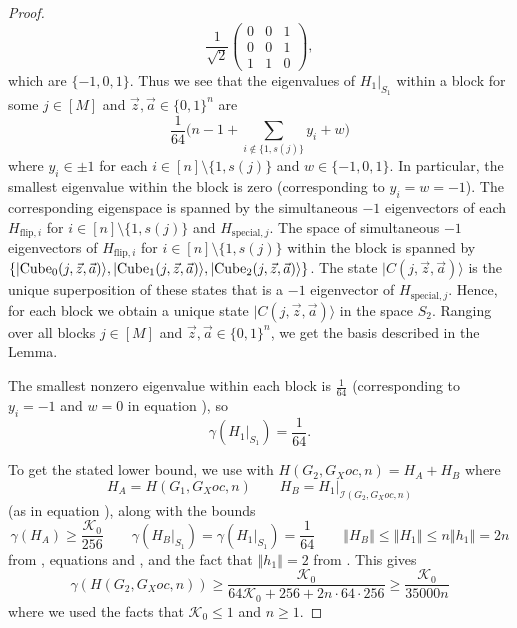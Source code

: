\documentclass[../thesis-main/thesis-main]{subfiles}
\begin{document}
\begin{proof}
\begin{equation}
\frac{1}{\sqrt{2}}\begin{pmatrix}
0 & 0 & 1\\
0 & 0 & 1\\
1 & 1 & 0
\end{pmatrix},
\end{equation}
which are $\{-1,0,1\}$. Thus we see that the eigenvalues of $H_1|_{S_{1}}$ within a block for some $j\in [M]$ and $\vec{z},\vec{a}\in\{0,1\}^{n}$ are
\begin{equation}
  \frac{1}{64}\bigg(n-1+\sum_{i\notin\{1,s(j)\}}y_{i}+w\bigg)
  \label{eq:block_eig}
\end{equation}
where $y_{i}\in\pm1$ for each $i\in[n]\setminus\{1,s(j)\}$ and $w\in\{-1,0,1\}$. In particular, the smallest eigenvalue within the block is zero (corresponding to $y_i=w=-1$). The corresponding eigenspace is spanned by the simultaneous $-1$ eigenvectors of each $H_{\mathrm{flip},i}$ for $i\in [n]\setminus \{1,s(j)\}$ and $H_{\mathrm{special},j}$. The space of simultaneous $-1$ eigenvectors of $H_{\mathrm{flip},i}$ for $i\in [n]\setminus\{1,s(j)\}$ within the block is spanned by $\{|{\operatorname{Cube}_{0}(j,\vec{z},\vec{a})}\rangle, |{\operatorname{Cube}_{1}(j,\vec{z},\vec{a})}\rangle, |{\operatorname{Cube}_{2}(j,\vec{z},\vec{a})}\rangle\}$. The state $|C(j,\vec{z},\vec{a})\rangle$  is the unique superposition of these states that is a $-1$ eigenvector of $H_{\mathrm{special},j}$. Hence, for each block we obtain a unique state $|C(j,\vec{z},\vec{a})\rangle$ in the space $S_2$. Ranging over all blocks $j\in [M]$ and $\vec{z},\vec{a}\in \{0,1\}^n$, we get the basis described in the Lemma.

The smallest nonzero eigenvalue within each block is $\frac{1}{64}$ (corresponding to $y_{i}=-1$ and $w=0$ in equation ), so 
\begin{equation}
\gamma(H_{1}|_{S_{1}})=\frac{1}{64}.\label{eq:lowerbnd_H1S_alph}
\end{equation}

To get the stated lower bound, we use  with $H(G_{2},G_Xoc,n) = H_{A}+H_{B}$ where 
\begin{equation}
H_{A}=H(G_{1},G_Xoc,n)\qquad H_{B}=H_{1}|_{\mathcal{I}(G_{2},G_Xoc,n)}
\end{equation}
(as in equation ), along with the bounds 
\begin{equation}
\gamma(H_{A}) \geq \frac{\mathcal{K}_0}{256}\qquad\gamma(H_{B}|_{S_{1}})=\gamma(H_{1}|_{S_{1}})=\frac{1}{64}\qquad\left\Vert H_{B}\right\Vert \leq\left\Vert H_{1}\right\Vert \leq n\left\Vert h_{1}\right\Vert =2n
\end{equation}
from , equations  and , and the fact that $\left\Vert h_{1}\right\Vert =2$ from . This gives
\begin{equation}
  \gamma(H(G_2,G_Xoc,n))
  \geq \frac{\mathcal{K}_0}{64\mathcal{K}_0+256+2n\cdot64\cdot256}
  \geq \frac{\mathcal{K}_0}{35000n}
\end{equation}
where we used the facts that $\mathcal{K}_0\leq 1$ and $n \ge 1$.
\end{proof}
\end{document}
